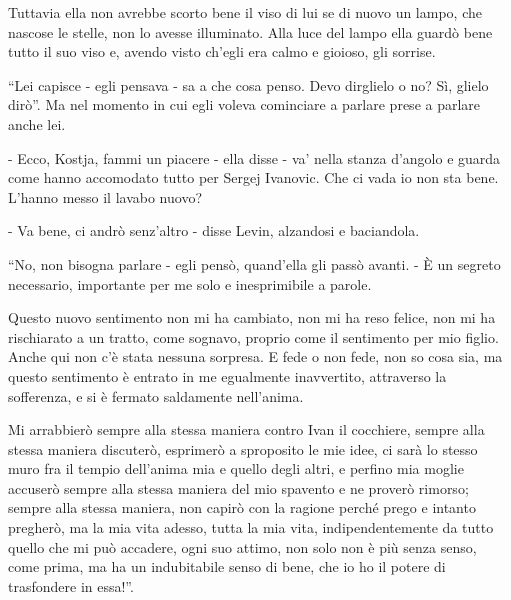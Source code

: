 Tuttavia ella non avrebbe scorto bene il viso di lui se di nuovo un lampo, che nascose le stelle, non lo avesse illuminato. Alla luce del lampo ella guardò bene tutto il suo viso e, avendo visto ch'egli era calmo e gioioso, gli sorrise. 

``Lei capisce - egli pensava - sa a che cosa penso. Devo dirglielo o no? Sì, glielo dirò''. Ma nel momento in cui egli voleva cominciare a parlare prese a parlare anche lei. 

- Ecco, Kostja, fammi un piacere - ella disse - va' nella stanza d'angolo e guarda come hanno accomodato tutto per Sergej Ivanovic. Che ci vada io non sta bene. L'hanno messo il lavabo nuovo? 

- Va bene, ci andrò senz'altro - disse Levin, alzandosi e baciandola. 

``No, non bisogna parlare - egli pensò, quand'ella gli passò avanti. - È un segreto necessario, importante per me solo e inesprimibile a parole. 

Questo nuovo sentimento non mi ha cambiato, non mi ha reso felice, non mi ha rischiarato a un tratto, come sognavo, proprio come il sentimento per mio figlio. Anche qui non c'è stata nessuna sorpresa. E fede o non fede, non so cosa sia, ma questo sentimento è entrato in me egualmente inavvertito, attraverso la sofferenza, e si è fermato saldamente nell'anima. 

Mi arrabbierò sempre alla stessa maniera contro Ivan il cocchiere, sempre alla stessa maniera discuterò, esprimerò a sproposito le mie idee, ci sarà lo stesso muro fra il tempio dell'anima mia e quello degli altri, e perfino mia moglie accuserò sempre alla stessa maniera del mio spavento e ne proverò rimorso; sempre alla stessa maniera, non capirò con la ragione perché prego e intanto pregherò, ma la mia vita adesso, tutta la mia vita, indipendentemente da tutto quello che mi può accadere, ogni suo attimo, non solo non è più senza senso, come prima, ma ha un indubitabile senso di bene, che io ho il potere di trasfondere in essa!''. 